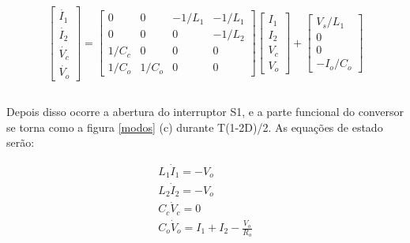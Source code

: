 \documentclass[
        12pt,
        openany, %
        oneside, %
        a4paper,			
        english,			
        brazil
        ]{abntbibufjf}
\begin{document}
\begin{equation}
\begin{array}{cc}
\begin{bmatrix}\dot{I_1} \\\dot{I_2} \\\dot{V_c} \\\dot{V_o}\end{bmatrix}=\begin{bmatrix}0&0&-1/L_1&-1/L_1 \\ 0&0&0&-1/L_2 \\ 1/C_c&0&0&0 \\ 1/C_o&1/C_o&0&0\end{bmatrix}\begin{bmatrix}I_1 \\I_2 \\V_c \\V_o
\end{bmatrix}+\begin{bmatrix}V_s/L_1 \\0\\0\\-I_o/C_o\end{bmatrix}\\\\
\end{array}
\end{equation}



Depois disso ocorre a abertura do interruptor S1, e a parte funcional do conversor se torna como a figura \ref{modos} (c) durante T(1-2D)/2. As equações de estado serão:

\begin{equation}
\begin{array}{cc}
L_1 \dot{I}_1 = - V_o\\
L_2 \dot{I}_2 = - V_o\\
C_c \dot{V}_c = 0\\
C_o \dot{V}_o = I_1+I_2-\frac{V_o}{R_o}
\end{array}
\end{equation}
\end{document}
